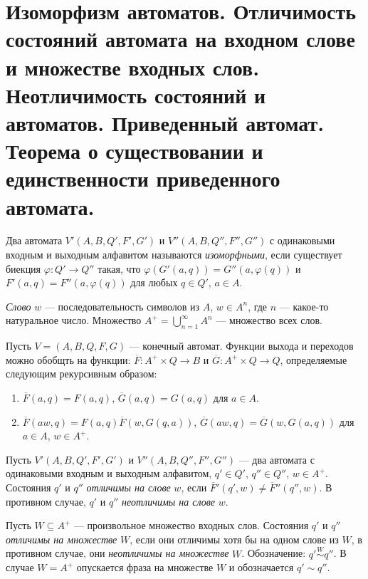 \section{Изоморфизм автоматов. Отличимость состояний автомата на входном слове и множестве входных слов. Неотличимость состояний и автоматов. Приведенный автомат. Теорема о существовании и единственности приведенного автомата.}

\begin{definition}
    Два автомата $V'(A, B, Q', F', G')$ и $V''(A, B, Q'', F'', G'')$ с одинаковыми входным и выходным алфавитом называются \textit{изоморфными}, если существует биекция $\varphi:Q'\to Q''$ такая, что $\varphi(G'(a, q)) = G''(a, \varphi(q))$ и $F'(a, q) = F''(a, \varphi(q))$ для любых $q\in Q'$, $a\in A$.
\end{definition}

\begin{definition}
    \textit{Слово} $w$ --- последовательность символов из $A$, $w\in A^n$, где $n$ --- какое-то натуральное число. Множество $A^+ = \bigcup_{n=1}^\infty A^n$ --- множество всех слов.
\end{definition}

\begin{definition}
    Пусть $V=(A, B, Q, F, G)$ --- конечный автомат. Функции выхода и переходов можно обобщть на функции: $\overline{F}:A^+\times Q\to B$ и $\overline{G}:A^+\times Q\to Q$, определяемые следующим рекурсивным образом:
    \begin{enumerate}[nolistsep]
        \item $\overline{F}(a, q) = F(a, q)$, $\overline{G}(a, q) = G(a, q)$ для $a\in A$.
        \item $\overline{F}(aw, q) = F(a, q)\overline{F}(w, G(q, a))$, $\overline{G}(aw, q) = \overline{G}(w, G(a, q))$ для $a\in A$, $w\in A^+$.
    \end{enumerate}
\end{definition}

\begin{definition}
    Пусть $V'(A, B, Q', F', G')$ и $V''(A, B, Q'', F'', G'')$ --- два автомата с одинаковыми входным и выходным алфавитом, $q'\in Q'$, $q''\in Q''$, $w\in A^+$.
    Состояния $q'$ и $q''$ \textit{отличимы на слове} $w$, если $\overline{F}'(q', w) \neq \overline{F}''(q'', w)$. В противном случае, $q'$ и $q''$ \textit{неотличимы на слове} $w$. 
\end{definition}

\begin{definition}
    Пусть $W\subseteq A^+$ --- произвольное множество входных слов. Состояния $q'$ и $q''$ \textit{отличимы на множестве} $W$, если они отличимы хотя бы на одном слове из $W$, в противном случае, они \textit{неотличимы на множестве} $W$. Обозначение: $q'\stackrel{W}{\sim} q''$. В случае $W=A^+$ опускается фраза на множестве $W$ и обозначается $q' \sim q''$.
\end{definition}

